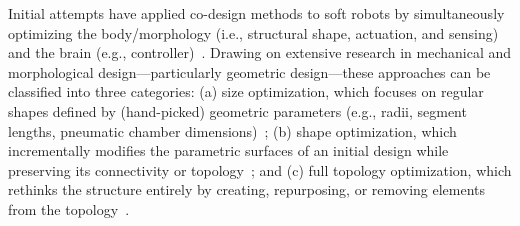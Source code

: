 Initial attempts have applied co-design methods to soft robots by simultaneously optimizing the body/morphology (i.e., structural shape, actuation, and sensing) and the brain (e.g., controller)~\citep{spielberg2019learning, cianchetti2021embodied, bhatia2021evolution, van2022co, wang2022curriculum, wang2023preco, navez2024contributions, wang2024diffusebot, junge2022leveraging}. Drawing on extensive research in mechanical and morphological design—particularly geometric design—these approaches can be classified\citep{chen2020design} into three categories: (a) size optimization, which focuses on regular shapes defined by (hand-picked) geometric parameters (e.g., radii, segment lengths, pneumatic chamber dimensions)~\citep{dammer2018design, wang2018programmable, guan2023trimmed, calisti2011octopus, pagliarani2024variable, polygerinos2015modeling, navez2024design, junge2022leveraging}; (b) shape optimization, which incrementally modifies the parametric surfaces of an initial design while preserving its connectivity or topology~\citep{siefert2019bio}; and (c) full topology optimization, which rethinks the structure entirely by creating, repurposing, or removing elements from the topology~\citep{sigmund2013topology, jewett2019topology, zhang2018topology, caasenbrood2020computational, spielberg2019learning, wang2022curriculum, legrand2023reconfigurable, wang2023softzoo, wang2023preco, wang2024diffusebot, pinskier2024diversity}.

